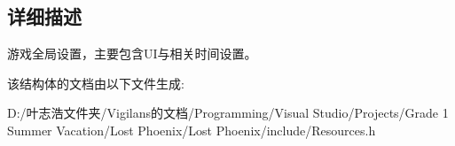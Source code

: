 \begin{DoxyCompactItemize}
\begin{tabbing}
\end{tabbing}\end{DoxyCompactItemize}


\subsection{详细描述}
游戏全局设置，主要包含\+U\+I与相关时间设置。 



该结构体的文档由以下文件生成\+:\begin{DoxyCompactItemize}
\item 
D\+:/叶志浩文件夹/\+Vigilans的文档/\+Programming/\+Visual Studio/\+Projects/\+Grade 1 Summer Vacation/\+Lost Phoenix/\+Lost Phoenix/include/Resources.\+h\end{DoxyCompactItemize}
